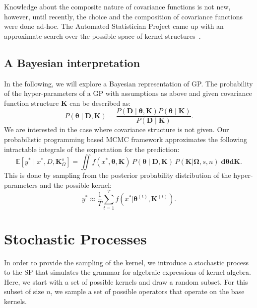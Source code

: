 \documentclass{article} %
\begin{document}
Knowledge about the composite nature of covariance functions is not new, however, until recently, the choice and the composition of covariance functions were done ad-hoc. The Automated Statistician Project came up with an approximate search over the possible space of kernel structures~\citep{duvenaud2013structure,lloyd2014automatic}. 

\subsection{A Bayesian interpretation}
In the following, we will explore a Bayesian representation of GP. The probability of the hyper-parameters of a GP with assumptions as above and given covariance function structure $\mathbf{K}$ can be described as:
\begin{equation}
\label{eq:hyperProbability}
P(\bm{\theta} \mid \mathbf{D,K}) = \frac{P(\mathbf{D} \mid \bm{\theta}, \mathbf{K})P(\bm{\theta} \mid  \mathbf{K})}{P(\mathbf{D} \mid \mathbf{K})}.
\end{equation}
We are interested in the case where covariance structure is not given. Our probabilistic programming based MCMC framework approximates the following intractable integrals of the expectation for the prediction:
\begin{equation}
\mathbb{E}[y^* \mid x^*,D,\mathbf{K}^s_{\Omega}] =\iint f(x^*,\bm{\theta},\mathbf{K})\,P(\bm{\theta} \mid \mathbf{D,\mathbf{K}})\,P(\mathbf{K}|\bm{\Omega},s,n) \; \mathbf{d} \bm{\theta} \mathbf{d} \mathbf{K}.  
\end{equation}
This is done by sampling from the posterior probability distribution of the hyper-parameters and the possible kernel:
\begin{equation}
y^* \approx \frac{1}{T} \sum^T_{t=1} f(x^* | \bm{\theta}^{(t)},\mathbf{K}^{(t)}). 
\end{equation}





\section{Stochastic Processes}
In order to provide the sampling of the kernel, we introduce a stochastic process to the SP that simulates the grammar for algebraic expressions of kernel algebra. Here, we start with a set of possible kernels and draw a random subset. For this subset of size $n$, we sample a set of possible operators that operate on the base kernels. 
\end{document}

